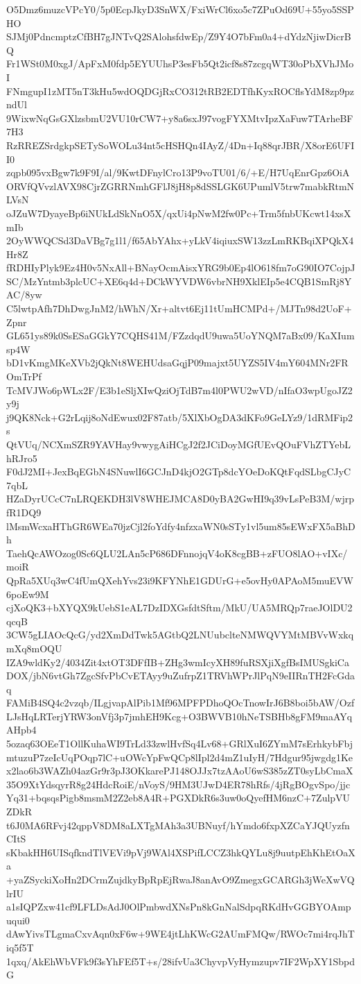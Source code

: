 O5Dmz6muzcVPcY0/5p0EcpJkyD3SnWX/FxiWrCl6xo5c7ZPuOd69U+55yo5SSPHO
SJMj0PdncmptzCfBH7gJNTvQ2SAlohsfdwEp/Z9Y4O7bFm0a4+dYdzNjiwDicrBQ
Fr1WSt0M0xgJ/ApFxM0fdp5EYUUhsP3esFb5Qt2icf8s87zcgqWT30oPbXVhJMoI
FNmgupI1zMT5nT3kHu5wdOQDGjRxCO312tRB2EDTfhKyxROCflsYdM8zp9pzndUl
9WixwNqGsGXlzsbmU2VU10rCW7+y8a6sxJ97vogFYXMtvIpzXaFuw7TArheBF7H3
RzRREZSrdgkpSETySoWOLu34nt5cHSHQn4IAyZ/4Dn+Iq88qrJBR/X8orE6UFII0
zqpb095vxBgw7k9F9I/al/9KwtDFnylCro13P9voTU01/6/+E/H7UqEnrGpz6OiA
ORVfQVvzlAVX98CjrZGRRNmhGFlJ8jH8p8dSSLGK6UPumlV5trw7mabkRtmNLVsN
oJZuW7DyayeBp6iNUkLdSkNnO5X/qxUi4pNwM2fw0Pc+Trm5fnbUKcwt14xsXmIb
2OyWWQCSd3DaVBg7g1l1/f65AbYAhx+yLkV4iqiuxSW13zzLmRKBqiXPQkX4Hr8Z
fRDHIyPlyk9Ez4H0v5NxAll+BNayOcmAisxYRG9b0Ep4lO618fm7oG90IO7CojpJ
SC/MzYntmb3plcUC+XE6q4d+DCkWYVDW6vbrNH9XklEIp5e4CQB1SmRj8YAC/8yw
C5lwtpAfh7DhDwgJnM2/hWhN/Xr+altvt6Ej11tUmHCMPd+/MJTn98d2UoF+Zpnr
GL651ys89k0SsESaGGkY7CQHS41M/FZzdqdU9uwa5UoYNQM7aBx09/KaXIumsp4W
bD1vKmgMKeXVb2jQkNt8WEHUdsaGqjP09majxt5UYZS5IV4mY604MNr2FROmTrPf
TcMVJWo6pWLx2F/E3b1eSljXIwQziOjTdB7m4l0PWU2wVD/nIfaO3wpUgoJZ2y9j
j9QK8Nck+G2rLqij8oNdEwux02F87atb/5XlXbOgDA3dKFo9GeLYz9/1dRMFip2s
QtVUq/NCXmSZR9YAVHay9vwygAiHCgJ2f2JCiDoyMGfUEvQOuFVhZTYebLhRJro5
F0dJ2MI+JexBqEGbN4SNuwlI6GCJnD4kjO2GTp8dcYOeDoKQtFqdSLbgCJyC7qbL
HZaDyrUCcC7nLRQEKDH3lV8WHEJMCA8D0yBA2GwHI9q39vLsPeB3M/wjrpfR1DQ9
lMsmWcxaHThGR6WEa70jzCjl2foYdfy4nfzxaWN0sSTy1vl5um85sEWxFX5aBhDh
TaehQcAWOzog0Sc6QLU2LAn5cP686DFnnojqV4oK8cgBB+zFUO8lAO+vIXc/moiR
QpRa5XUq3wC4fUmQXehYvs23i9KFYNhE1GDUrG+e5ovHy0APAoM5muEVW6poEw9M
cjXoQK3+bXYQX9kUebS1eAL7DzIDXGsfdtSftm/MkU/UA5MRQp7raeJOlDU2qcqB
3CW5gLIAOcQcG/yd2XmDdTwk5AGtbQ2LNUubclteNMWQVYMtMBVvWxkqmXq8mOQU
IZA9wldKy2/4034Zit4xtOT3DFfIB+ZHg3wmIcyXH89fuRSXjiXgfBsIMUSgkiCa
DOX/jbN6vtGh7ZgcSfvPbCvETAyy9uZufrpZ1TRVhWPrJlPqN9eIIRnTH2FcGdaq
FAMiB4SQ4c2vzqb/ILgjvapAlPib1Mf96MPFPDhoQOcTnowIrJ6B8boi5bAW/Ozf
LJsHqLRTerjYRW3onVfj3p7jmhEH9Kcg+O3BWVB10hNeTSBHb8gFM9maAYqAHpb4
5ozaq63OEeT1OllKuhaWI9TrLd33zwlHvfSq4Lv68+GRlXuI6ZYmM7sErhkybFbj
mtuzuP7zeIcUqPOqp7lC+uOWcYpFwQCp8lIpl2d4mZ1uIyH/7Hdgur95jwgdg1Ke
x2lao6b3WAZh04azGr9r3pJ3OKkarePJ148OJJx7tzAAoU6wS385zZT0syLbCmaX
35O9XtYdsqyrR8g24HdcRoiE/nVoyS/9HM3UJwD4ER78hRfs/4jRgBOgvSpo/jjc
Yq31+bqsqsPigb8msmM2Z2eb8A4R+PGXDkR6s3uw0oQyefHM6nzC+7ZulpVUZDkR
t6J0MA6RFvj42qppV8DM8aLXTgMAh3a3UBNuyf/hYmdo6fxpXZCaYJQUyzfnCItS
sKbakHH6UISqfkndTlVEVi9pVj9WAl4XSPifLCCZ3hkQYLu8j9uutpEhKhEtOaXa
+yaZSyckiXoHn2DCrmZujdkyBpRpEjRwaJ8anAvO9ZmegxGCARGh3jWeXwVQlrIU
a1sIQPZxw41cf9LFLDsAdJ0OlPmbwdXNsPn8kGnNalSdpqRKdHvGGBYOAmpuqui0
dAwYivsTLgmaCxvAqn0xF6w+9WE4jtLhKWcG2AUmFMQw/RWOc7mi4rqJhTiq5f5T
1qxq/AkEhWbVFk9f3sYhFEf5T+s/28ifvUa3ChyvpVyHymzupv7IF2WpXY1SbpdG
